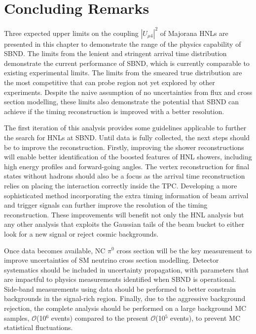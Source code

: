 \section{Concluding Remarks}
\label{sec:result_remarks}

Three expected upper limits on the coupling $|U_{\mu4}|^2$ of Majorana HNLs are presented in this chapter to demonstrate the range of the physics capability of SBND.
The limits from the lenient and stringent arrival time distribution demonstrate the current performance of SBND, which is currently comparable to existing experimental limits.
The limits from the smeared true distribution are the most competitive that can probe region not yet explored by other experiments.
Despite the naive assumption of no uncertainties from flux and cross section modelling, these limits also demonstrate the potential that SBND can achieve if the timing reconstruction is improved with a better resolution.

The first iteration of this analysis provides some guidelines applicable to further the search for HNLs at SBND.
Until data is fully collected, the next steps should be to improve the reconstruction.
Firstly, improving the shower reconstructions will enable better identification of the boosted features of HNL showers, including high energy profiles and forward-going angles.
The vertex reconstruction for final states without hadrons should also be a focus as the arrival time reconstruction relies on placing the interaction correctly inside the TPC.
Developing a more sophisticated method incorporating the extra timing information of beam arrival and trigger signals can further improve the resolution of the timing reconstruction.
These improvements will benefit not only the HNL analysis but any other analysis that exploits the Gaussian tails of the beam bucket to either look for a new signal or reject cosmic backgrounds.

Once data becomes available, NC $\pi^0$ cross section will be the key measurement to improve uncertainties of SM neutrino cross section modelling.
Detector systematics should be included in uncertainty propagation, with parameters that are impactful to physics measurements identified when SBND is operational.
Side-band measurements using data should be performed to better constrain backgrounds in the signal-rich region.
Finally, due to the aggressive background rejection, the complete analysis should be performed on a large background MC samples, $\mathcal{O}$(10$^6$ events) compared to the present $\mathcal{O}$(10$^5$ events), to prevent MC statistical fluctuations.
